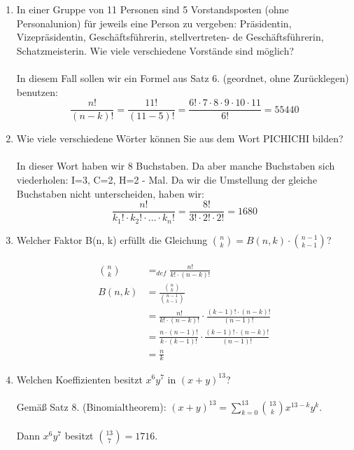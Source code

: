 \begin{enumerate}[label=(\alph*)]
        \item In einer Gruppe von 11 Personen sind 5 Vorstandsposten (ohne Personalunion) für jeweils
        eine Person zu vergeben: Präsidentin, Vizepräsidentin, Geschäftsführerin, stellvertreten-
        de Geschäftsführerin, Schatzmeisterin. Wie viele verschiedene Vorstände sind möglich?\\\\
        In diesem Fall sollen wir ein Formel aus Satz 6. (geordnet, ohne Zur\"ucklegen) benutzen:
        \[\frac{n!}{(n-k)!}=\frac{11!}{(11-5)!}
        =\frac{6!\cdot7\cdot8\cdot9\cdot10\cdot11}{6!}
        =55440\]

        \item Wie viele verschiedene Wörter können Sie aus dem Wort PICHICHI bilden?\\\\
        In dieser Wort haben wir 8 Buchstaben. Da aber manche Buchstaben sich viederholen: 
        I=3, C=2, H=2 - Mal. Da wir die Umstellung der gleiche Buchstaben nicht unterscheiden, haben wir:
        \[\frac{n!}{k_1!\cdot k_2!\cdot\ldots\cdot k_n!} = \frac{8!}{3!\cdot2!\cdot2!} = 1680\]

        \item Welcher Faktor B(n, k) erfüllt die Gleichung $\binom{n}{k} = B(n,k)\cdot\binom{n-1}{k-1}$?\\\\
        \begin{align*}
        \binom{n}{k} &=_{def} \frac{n!}{k!\cdot(n-k)!}\\
        B(n,k) &= \frac{\binom{n}{k}}{\binom{n-1}{k-1}}\\
        &= \frac{n!}{k!\cdot(n-k)!} \cdot \frac{(k-1)!\cdot(n-k)!}{(n-1)!}\\
        &= \frac{n\cdot(n-1)!}{k\cdot(k-1)!} \cdot \frac{(k-1)!\cdot(n-k)!}{(n-1)!}\\
        &= \frac{n}{k}
        \end{align*}
        
        \item Welchen Koeffizienten besitzt $x^6y^7$ in $(x+y)^{13}$?\\\\
        Gemäß Satz 8. (Binomialtheorem): $(x+y)^{13} = \sum_{k=0}^{13} \binom{13}{k}x^{13-k}y^k$.\\\\
        Dann $x^6y^7$ besitzt $\binom{13}{7} = 1716$.


\end{enumerate}
